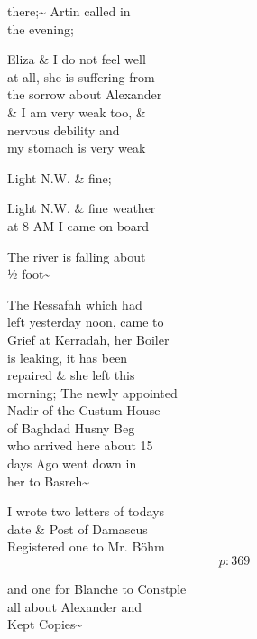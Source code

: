 \documentclass{report}
\begin{document}
	\par{
 	there;\~{} Artin called in\ \\the evening;\ \\
	}

	\par{
 	Eliza \& I do not feel well\ \\at all, she is suffering from\ \\the sorrow about Alexander\ \\\& I am very weak too, \&\ \\nervous debility and\ \\my stomach is very weak\ \\
	}

	\par{
 	Light N.W. \& fine;\ \\
	}

	\par{
 	Light N.W. \& fine weather\ \\at 8 AM I came on board\ \\
	}

	\par{
 	The river is falling about\ \\½ foot\~{}\ \\
	}

	\par{
 	The Ressafah which had\ \\left yesterday noon, came to\ \\Grief at Kerradah, her Boiler\ \\is leaking, it has been\ \\repaired \& she left this\ \\morning; The newly appointed\ \\Nadir of the Custum House\ \\of Baghdad Husny Beg\ \\who arrived here about 15\ \\days Ago went down in\ \\her to Basreh\~{}\ \\
	}

	\par{
 	I wrote two letters of todays\ \\date \& Post of Damascus\ \\Registered one to Mr. Böhm\ \\
  \[p: 369 \]

	}


	\par{
 	and one for Blanche to Constple\ \\all about Alexander and\ \\Kept Copies\~{}\ \\
	}
\end{document}
